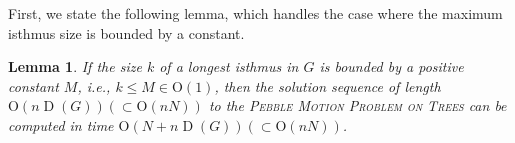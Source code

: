 \documentclass[letter,11pt]{article}
\newtheorem{la}[thm]{Lemma}
\newcommand{\white}{\qquad{\framebox{\rule{0pt}{4pt}}}}
\newcommand{\owari}{\hfill\white}
\theoremstyle{definition}
\theoremstyle{definition}
\DeclareMathOperator{\D}{D}
\newcommand{\1}{\boldmath$~1~$\unboldmath}
\newcommand{\Ord}{\mathrm{O}}
\newcommand{\qedgo}{\vspace{0.35cm}}
\newcommand{\tume}{\hspace*{0.2em}}
\newenvironment{Proofof}[1]{\expandafter
\paragraph{{\it Proof of #1.}}}{\hspace{5mm}\owari\qedgo}
\begin{document}
First, we state the following lemma, which handles the case where the
maximum isthmus size is bounded by a constant.


\begin{la}\label{constant}
If the size $k$ of a longest isthmus in $G$ is bounded by a positive constant $M$, i.e., $k \leq M \in \Ord(1)$, 
then the solution sequence of length $\Ord(n\D(G)) (\subset \Ord(nN))$ to 
the \textsc{Pebble Motion Problem on Trees} can be computed in time $\Ord(N + n\D(G)) (\subset \Ord(nN))$.
\end{la}


\end{document}
